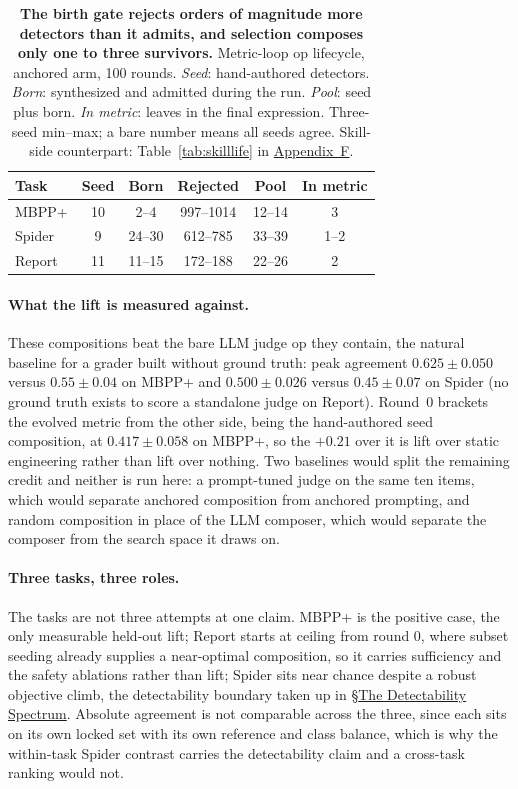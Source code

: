 \documentclass[letterpaper]{article} %
\begin{document}
\begin{table}[t]
\centering
\footnotesize
\setlength{\tabcolsep}{2.5pt}
\begin{tabular}{lccccc}
\toprule
Task & Seed & Born & Rejected & Pool & In metric \\
\midrule
MBPP+ & 10 & 2--4 & 997--1014 & 12--14 & 3 \\
Spider & 9 & 24--30 & 612--785 & 33--39 & 1--2 \\
Report & 11 & 11--15 & 172--188 & 22--26 & 2 \\
\bottomrule
\end{tabular}
\caption{\textbf{The birth gate rejects orders of magnitude more detectors than it admits, and selection composes only one to three survivors.} Metric-loop op lifecycle, anchored arm, 100 rounds. \emph{Seed}: hand-authored detectors. \emph{Born}: synthesized and admitted during the run. \emph{Pool}: seed plus born. \emph{In metric}: leaves in the final expression. Three-seed min--max; a bare number means all seeds agree. Skill-side counterpart: Table~\ref{tab:skilllife} in \hyperref[app:lifecycle]{Appendix~F}.}
\label{tab:oplife}
\end{table}

\paragraph{What the lift is measured against.}
These compositions beat the bare LLM judge op they contain, the natural baseline for a grader built without ground truth: peak agreement $0.625\pm0.050$ versus $0.55\pm0.04$ on MBPP+ and $0.500\pm0.026$ versus $0.45\pm0.07$ on Spider (no ground truth exists to score a standalone judge on Report). Round~0 brackets the evolved metric from the other side, being the hand-authored seed composition, at $0.417\pm0.058$ on MBPP+, so the $+0.21$ over it is lift over static engineering rather than lift over nothing. Two baselines would split the remaining credit and neither is run here: a prompt-tuned judge on the same ten items, which would separate anchored composition from anchored prompting, and random composition in place of the LLM composer, which would separate the composer from the search space it draws on.

\paragraph{Three tasks, three roles.}
The tasks are not three attempts at one claim. MBPP+ is the positive case, the only measurable held-out lift; Report starts at ceiling from round 0, where subset seeding already supplies a near-optimal composition, so it carries sufficiency and the safety ablations rather than lift; Spider sits near chance despite a robust objective climb, the detectability boundary taken up in \S\hyperref[sec:detect]{The Detectability Spectrum}. Absolute agreement is not comparable across the three, since each sits on its own locked set with its own reference and class balance, which is why the within-task Spider contrast carries the detectability claim and a cross-task ranking would not.
\end{document}
